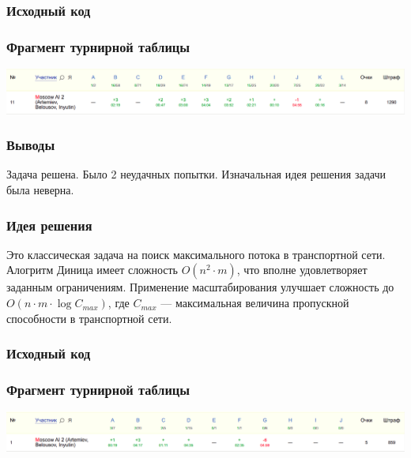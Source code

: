 \subsubsection*{Исходный код}

\subsubsection*{Фрагмент турнирной таблицы}
\includegraphics[width=\textwidth]{images/220418.png}\newline\noindent
\subsubsection*{Выводы}
Задача решена. Было 2 неудачных попытки. Изначальная идея решения задачи была неверна.
\pagebreak


\subsubsection*{Идея решения}
Это классическая задача на поиск максимального потока в транспортной сети. Алогритм Диница имеет сложность $O(n ^ 2 \cdot m)$, что вполне удовлетворяет заданным ограничениям. Применение масштабирования улучшает сложность до $O(n \cdot m \cdot \log{C_{max}})$, где $C_{max}$ --- максимальная величина пропускной способности в транспортной сети.
\subsubsection*{Исходный код}

\subsubsection*{Фрагмент турнирной таблицы}
\includegraphics[width=\textwidth]{images/220419.png}\newline\noindent
